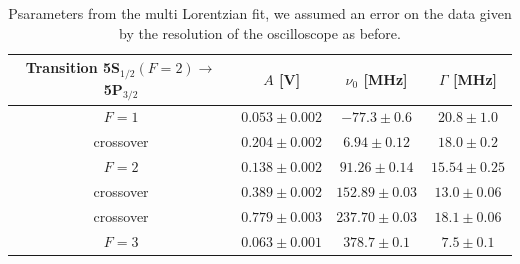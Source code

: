 \documentclass[a4paper,10pt]{article}
\begin{document}
\begin{table}[H]
      \centering
\begin{tabular}{c|c|c|c}
          Transition 5S$_{1/2}(F=2)\to$ 5P$_{3/2}$ & $A$ [V] & $\nu_0$ [MHz] & $\Gamma$ [MHz]\\
           \hline
           $F=1$ & $  0.053\pm  0.002$ & $  -77.3\pm 0.6 $ & $20.8\pm 1.0$ \\
              crossover & $  0.204\pm  0.002$ & $   6.94\pm 0.12$ & $18.0\pm 0.2 $ \\
           $F=2$ & $  0.138\pm  0.002$ & $  91.26\pm 0.14$ & $ 15.54\pm 0.25$ \\
           crossover & $  0.389\pm  0.002$ & $ 152.89 \pm 0.03 $ & $ 13.0\pm 0.06$ \\
           crossover & $  0.779\pm  0.003$ & $ 237.70\pm 0.03 $ & $ 18.1\pm 0.06$ \\
           $F=3$ & $  0.063\pm  0.001$ & $ 378.7 \pm 0.1 $ & $ 7.5\pm 0.1$ \\
           \hline
        \end{tabular}
        \caption{Psarameters from the multi Lorentzian fit, we assumed an error on the data given by the resolution of the oscilloscope as before.}\label{parametersfit}
\end{table}
 
\end{document}
